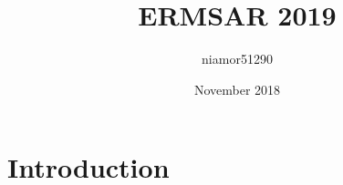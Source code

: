 \documentclass{article}
\title{ERMSAR 2019}
\author{niamor51290 }
\date{November 2018}
\begin{document}
\maketitle

\section{Introduction}
\end{document}
